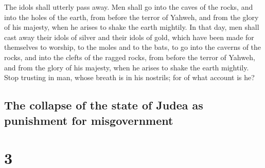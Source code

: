  The idols shall utterly pass away.  Men
shall go into the caves of the rocks, and into the holes of the earth,
from before the terror of Yahweh, and from the glory of his majesty,
when he arises to shake the earth mightily.  In that day,
men shall cast away their idols of silver and their idols of gold, which
have been made for themselves to worship, to the moles and to the bats,
 to go into the caverns of the rocks, and into the clefts
of the ragged rocks, from before the terror of Yahweh, and from the
glory of his majesty, when he arises to shake the earth mightily.
 Stop trusting in man, whose breath is in his nostrils;
for of what account is he?

\hypertarget{the-collapse-of-the-state-of-judea-as-punishment-for-misgovernment}{%
\subsection{The collapse of the state of Judea as punishment for
misgovernment}\label{the-collapse-of-the-state-of-judea-as-punishment-for-misgovernment}}

\hypertarget{section-2}{%
\section{3}\label{section-2}}

